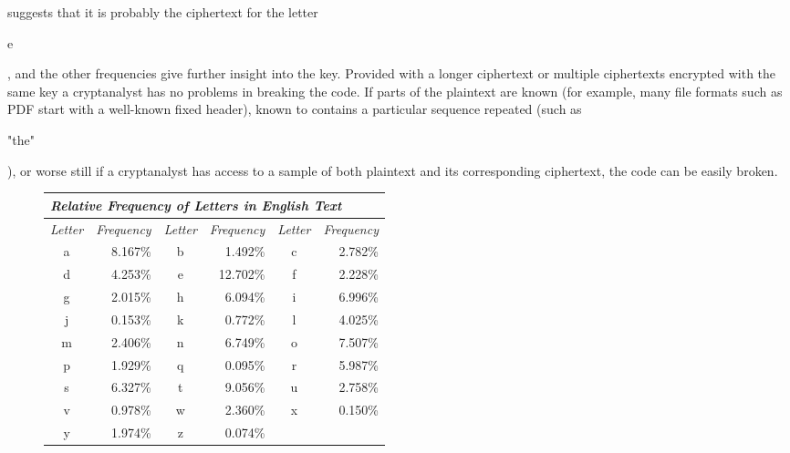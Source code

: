 suggests that it is probably the ciphertext for the letter
\begin{code}e\end{code}, and the other frequencies give further
insight into the key. Provided with a longer ciphertext or
multiple ciphertexts encrypted with the same key a cryptanalyst
has no problems in breaking the code.
If parts of the plaintext are known (for example, many file
formats such as PDF start with a well-known fixed header),
known to contains a particular sequence repeated (such as
\begin{code}"the"\end{code}), or worse still if a cryptanalyst has
access to a sample of both plaintext and its corresponding
ciphertext, the code can be easily broken.
\begin{figure*}[htb]
\begin{tabular}{|c|r|c|r|c|r|} \hline
  \multicolumn{6}{|l|}{\textit{Relative Frequency of Letters in English Text}} \\ \hline\hline
  \textit{Letter} & \textit{Frequency} & \textit{Letter} & \textit{Frequency}
  & \textit{Letter} & \textit{Frequency} \\ \hline
  a & 8.167\% &
  b & 1.492\% &
  c & 2.782\% \\
  d & 4.253\% &
  e & 12.702\% &
  f & 2.228\% \\
  g & 2.015\% &
  h & 6.094\% &
  i & 6.996\% \\
  j & 0.153\% &
  k & 0.772\% &
  l & 4.025\% \\
  m & 2.406\% &
  n & 6.749\% &
  o & 7.507\% \\
  p & 1.929\% &
  q & 0.095\% &
  r & 5.987\% \\
  s & 6.327\% &
  t & 9.056\% &
  u & 2.758\% \\
  v & 0.978\% &
  w & 2.360\% &
  x & 0.150\% \\
  y & 1.974\% &
  z & 0.074\% & & \\ \hline
\end{tabular}
\end{figure*}


